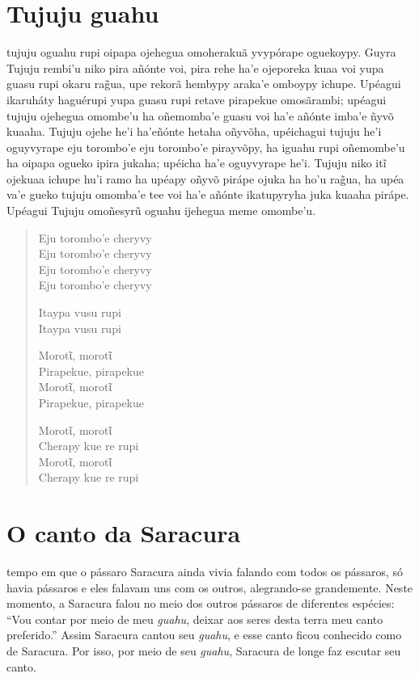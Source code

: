 \chapter{Tujuju guahu}

 tujuju oguahu rupi oipapa ojehegua omoherakuã yvypórape oguekoypy.
Guyra Tujuju rembi'u niko pira añónte voi, pira rehe ha'e ojeporeka kuaa
voi yupa guasu rupi okaru rag̃ua, upe rekorã hembypy araka'e omboypy
ichupe. Upéagui ikaruháty haguérupi yupa guasu rupi retave pirapekue
omosãrambi; upéagui tujuju ojehegua omombe'u ha oñemomba'e guasu voi
ha'e añónte imba'e ñyvõ kuaaha. Tujuju ojehe he'i ha'eñónte hetaha
oñyvõha, upéichagui tujuju he'i oguyvyrape eju torombo'e eju torombo'e
pirayvõpy, ha iguahu rupi oñemombe'u ha oipapa ogueko ipira jukaha;
upéicha ha'e oguyvyrape he'i. Tujuju niko itĩ ojekuaa ichupe hu'i ramo
ha upéapy oñyvõ pirápe ojuka ha ho'u rag̃ua, ha upéa va'e gueko tujuju
omomba'e tee voi ha'e añónte ikatupyryha juka kuaaha pirápe. Upéagui
Tujuju omoñesyrũ oguahu ijehegua meme omombe'u.

\begin{verse}
Eju torombo'e cheryvy\\
Eju torombo'e cheryvy\\
Eju torombo'e cheryvy\\
Eju torombo'e cheryvy

Itaypa vusu rupi\\
Itaypa vusu rupi

Morotῖ, morotῖ\\
Pirapekue, pirapekue\\
Morotῖ, morotῖ\\
Pirapekue, pirapekue

\pagebreak
Morotῖ, morotῖ\\
Cherapy kue re rupi\\
Morotῖ, morotῖ\\
Cherapy kue re rupi
\end{verse}

\chapter{O canto da Saracura}

 tempo em que o pássaro Saracura ainda vivia falando com todos os
pássaros, só havia pássaros e eles falavam uns com os outros,
alegrando-se grandemente. Neste momento, a Saracura falou no meio dos
outros pássaros de diferentes espécies: ``Vou contar por meio de meu
\textit{guahu}, deixar aos seres desta terra meu canto preferido.'' Assim
Saracura cantou seu \textit{guahu}, e esse canto ficou conhecido como de
Saracura. Por isso, por meio de seu \textit{guahu}, Saracura de longe faz
escutar seu canto.

